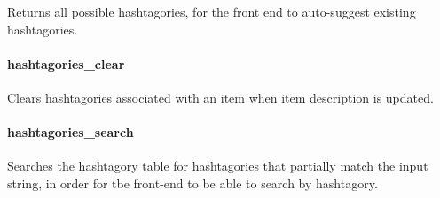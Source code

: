 Returns all possible hashtagories, for the front end to auto-suggest
existing hashtagories.

\begin{Shaded}
\begin{Highlighting}[]
 
      
\end{Highlighting}
\end{Shaded}

\paragraph{hashtagories\_clear}\label{hashtagoriesux5fclear}

Clears hashtagories associated with an item when item description is
updated.

\begin{Shaded}
\begin{Highlighting}[]
  \NormalTok{(}\NormalTok{))}
       
\end{Highlighting}
\end{Shaded}

\paragraph{hashtagories\_search}\label{hashtagoriesux5fsearch}

Searches the hashtagory table for hashtagories that partially match the
input string, in order for tbe front-end to be able to search by
hashtagory.

\begin{Shaded}
\begin{Highlighting}[]
  \NormalTok{(}\NormalTok{))}
  
 
\end{Highlighting}
\end{Shaded}

